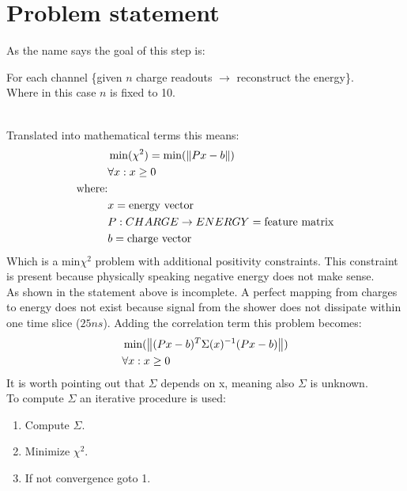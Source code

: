 \section{Problem statement}
As the name says the goal of this step is: \\
\begin{claim}
  For each channel \{given $n$ charge readouts $\rightarrow$ reconstruct the energy\}. \\
  \quad Where in this case $n$ is fixed to 10. 
\end{claim}\\
Translated into mathematical terms this means:
\begin{equation}\label{eq:chisq}
  \begin{split}
    & \min(\chi^2)=\min(\left\lVert Px - b\right\rVert) \\
    & \forall x: x \geq 0\\
    \text{where:}&  \\
    & x = \text{energy vector} \\
    & P:CHARGE \rightarrow ENERGY =\text{feature matrix} \\
    & b = \text{charge vector}
  \end{split}
\end{equation}
Which is a min$\chi^2$ problem with additional positivity constraints. This constraint is present because physically speaking negative energy does not make sense. \\
As shown in \cite{amplituamplitude_reconde_recon} the statement above is incomplete. A perfect mapping from charges to energy does not exist because signal from the shower does not dissipate within one time slice ($25ns$). Adding the correlation term this problem becomes:
\begin{equation}\label{eq:constrained_chi_sq}
  \begin{split}
      &\min(\left\lVert(Px - b)^T\Sigma(x)^{-1}(Px - b)\right\rVert) \\
      & \forall x: x \geq 0\\
  \end{split}
\end{equation}
It is worth pointing out that $\Sigma$ depends on x, meaning also $\Sigma$ is unknown. \\
To compute $\Sigma$ an iterative procedure is used:
\begin{enumerate}
  \item Compute $\Sigma$.
  \item Minimize $\chi^2$.
  \item If not convergence goto 1.
\end{enumerate}
